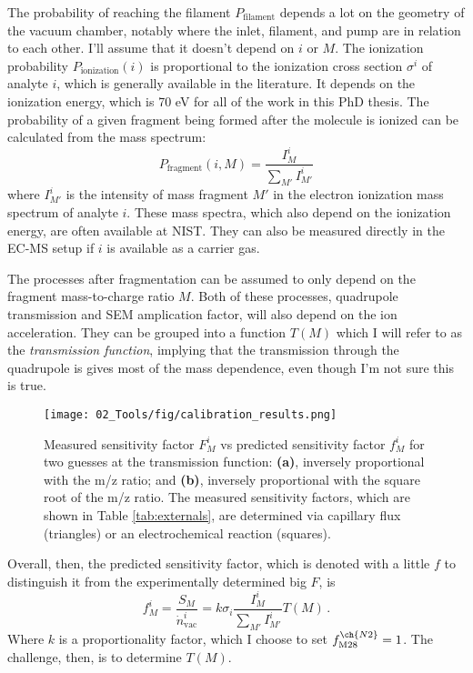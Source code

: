 The probability of reaching the filament $P_\text{filament}$ depends a lot on the geometry of the vacuum chamber, notably where the inlet, filament, and pump are in relation to each other. I'll assume that it doesn't depend on $i$ or $M$. The ionization probability $P_\text{ionization}(i)$ is proportional to the ionization cross section $\sigma^i$ of analyte $i$, which is generally available in the literature. It depends on the ionization energy, which is 70 eV for all of the work in this PhD thesis. The probability of a given fragment being formed after the molecule is ionized can be calculated from the mass spectrum:
\begin{equation}
P_\text{fragment}(i, M) = \frac{I_M^i}{\sum_{M'}I_{M'}^i}
\end{equation}
where $I_{M'}^i$ is the intensity of mass fragment $M'$ in the electron ionization mass spectrum of analyte $i$. These mass spectra, which also depend on the ionization energy, are often available at NIST\cite{NIST}. They can also be measured directly in the EC-MS setup if $i$ is available as a carrier gas. 

The processes after fragmentation can be assumed to only depend on the fragment mass-to-charge ratio $M$. Both of these processes, quadrupole transmission and SEM amplication factor, will also depend on the ion acceleration. They can be grouped into a function $T(M)$ which I will refer to as the \textit{transmission function}, implying that the transmission through the quadrupole is gives most of the mass dependence, even though I'm not sure this is true.

\begin{figure}[t]
	\texttt{[image: 02\_Tools/fig/calibration\_results.png]}
	\caption{Measured sensitivity factor $F_M^i$ vs predicted sensitivity factor $f_M^i$ for two guesses at the transmission function: \textbf{(a)}, inversely proportional with the m/z ratio; and \textbf{(b)}, inversely proportional with the square root of the m/z ratio. The measured sensitivity factors, which are shown in Table \ref{tab:externals}, are determined via capillary flux (triangles) or an electrochemical reaction (squares). }
	\label{fig:transmission}
\end{figure}

Overall, then, the predicted sensitivity factor, which is denoted with a little $f$ to distinguish it from the experimentally determined big $F$, is
\begin{equation}
f_M^i = \frac{S_M}{\dot{n}^i_\text{vac}} = k \sigma_i \frac{I_M^i}{\sum_{M'}I_{M'}^i} T(M)\,.\label{eq:rsf}
\end{equation} 
Where $k$ is a proportionality factor, which I choose to set $f_{\text{M28}}^{\ch{N2}} = 1$. The challenge, then, is to determine $T(M)$.


